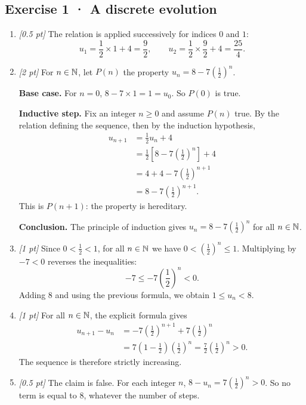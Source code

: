 \subsection*{Exercise 1 · A discrete evolution}\begin{enumerate}

\item \textit{[0.5 pt]} The relation is applied successively for indices $0$ and $1$:\[u_1=\frac{1}{2}\times 1+4=\frac{9}{2},\qquad u_2=\frac{1}{2}\times \frac{9}{2}+4=\frac{25}{4}.\]

\item \textit{[2 pt]} For $n\in\mathbb N$, let $P(n)$ the property $u_n=8-7\left(\frac{1}{2}\right)^n$.
\par\smallskip\textbf{Base case.} For $n=0$, $8-7\times1=1=u_0$. So $P(0)$ is true.
\par\smallskip\textbf{Inductive step.} Fix an integer $n\ge0$ and assume $P(n)$ true. By the relation defining the sequence, then by the induction hypothesis,
\[\begin{aligned}u_{n+1}&=\frac{1}{2}u_n+4\\
&=\frac{1}{2}\left[8-7\left(\frac{1}{2}\right)^n\right]+4\\
&=4+4-7\left(\frac{1}{2}\right)^{n+1}\\
&=8-7\left(\frac{1}{2}\right)^{n+1}.
\end{aligned}\]
This is $P(n+1)$: the property is hereditary.
\par\smallskip\textbf{Conclusion.} The principle of induction gives $u_n=8-7\left(\frac{1}{2}\right)^n$ for all $n\in\mathbb N$.

\item \textit{[1 pt]} Since $0<\frac{1}{2}<1$, for all $n\in\mathbb N$ we have $0<(\frac{1}{2})^n\le1$. Multiplying by $-7<0$ reverses the inequalities:
\[-7\le-7(\frac{1}{2})^n<0.\]
Adding $8$ and using the previous formula, we obtain $1\le u_n<8$.

\item \textit{[1 pt]} For all $n\in\mathbb N$, the explicit formula gives
\[\begin{aligned}u_{n+1}-u_n&=-7(\frac{1}{2})^{n+1}+7(\frac{1}{2})^n\\&=7(1-\frac{1}{2})(\frac{1}{2})^n=\frac{7}{2}(\frac{1}{2})^n>0.\end{aligned}\]
The sequence is therefore strictly increasing.

\item \textit{[0.5 pt]} The claim is false. For each integer $n$, $8-u_n=7(\frac{1}{2})^n>0$. So no term is equal to $8$, whatever the number of steps.

\end{enumerate}


